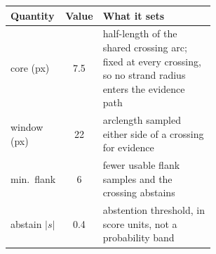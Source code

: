 \begin{tabular}{lc>{\raggedright\arraybackslash}p{0.58\linewidth}}
\toprule
Quantity & Value & What it sets \\
\midrule
core (px) & 7.5 & half-length of the shared crossing arc; fixed at every crossing, so no strand radius enters the evidence path \\
window (px) & 22 & arclength sampled either side of a crossing for evidence \\
min.\ flank & 6 & fewer usable flank samples and the crossing abstains \\
abstain $\lvert s\rvert$ & 0.4 & abstention threshold, in score units, not a probability band \\
\bottomrule
\end{tabular}
